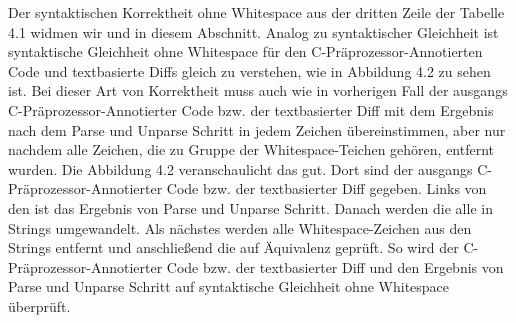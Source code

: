 Der syntaktischen Korrektheit ohne Whitespace aus der dritten Zeile der Tabelle 4.1 widmen wir und in diesem Abschnitt. Analog zu syntaktischer Gleichheit ist syntaktische Gleichheit ohne Whitespace für den C-Präprozessor-Annotierten Code und textbasierte Diffs gleich zu verstehen, wie in Abbildung 4.2 zu sehen ist. Bei dieser Art von Korrektheit muss auch wie in vorherigen Fall der ausgangs C-Präprozessor-Annotierter Code bzw. der textbasierter Diff  mit dem Ergebnis nach dem Parse und Unparse Schritt in jedem Zeichen übereinstimmen, aber nur nachdem alle Zeichen, die zu Gruppe der Whitespace-Teichen gehören, entfernt wurden. Die Abbildung 4.2 veranschaulicht das gut. Dort sind der ausgangs C-Präprozessor-Annotierter Code bzw. der textbasierter Diff gegeben. Links von den ist das Ergebnis von Parse und Unparse Schritt. Danach werden die alle in Strings umgewandelt. Als nächstes werden alle Whitespace-Zeichen aus den Strings entfernt und anschließend die auf Äquivalenz geprüft. So wird der C-Präprozessor-Annotierter Code bzw. der textbasierter Diff und den Ergebnis von Parse und Unparse Schritt auf syntaktische Gleichheit ohne Whitespace überprüft.

